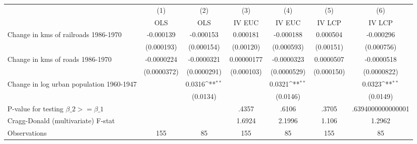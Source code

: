 {
\def\sym#1{\ifmmode^{#1}\else\(^{#1}\)\fi}
\begin{tabular}{l*{6}{c}}
\hline\hline
                &\multicolumn{1}{c}{(1)}&\multicolumn{1}{c}{(2)}&\multicolumn{1}{c}{(3)}&\multicolumn{1}{c}{(4)}&\multicolumn{1}{c}{(5)}&\multicolumn{1}{c}{(6)}\\
                &\multicolumn{1}{c}{OLS}&\multicolumn{1}{c}{OLS}&\multicolumn{1}{c}{IV EUC}&\multicolumn{1}{c}{IV EUC}&\multicolumn{1}{c}{IV LCP}&\multicolumn{1}{c}{IV LCP}\\
\hline
Change in kms of railroads 1986-1970&-0.000139         &-0.000153         & 0.000181         &-0.000188         & 0.000504         &-0.000296         \\
                &(0.000193)         &(0.000154)         &(0.00120)         &(0.000593)         &(0.00151)         &(0.000756)         \\
[1em]
Change in kms of roads 1986-1970&-0.0000224         &-0.0000321         &0.00000177         &-0.0000323         &0.0000507         &-0.0000518         \\
                &(0.0000372)         &(0.0000291)         &(0.000103)         &(0.0000529)         &(0.000150)         &(0.0000822)         \\
[1em]
Change in log urban population 1960-1947&                  &   0.0316\sym{**} &                  &   0.0321\sym{**} &                  &   0.0323\sym{**} \\
                &                  & (0.0134)         &                  & (0.0146)         &                  & (0.0149)         \\
\hline
P-value for testing $\beta\_{2} >= \beta\_{1}$&                  &                  &    .4357         &    .6106         &    .3705         &.6394000000000001         \\
Cragg-Donald (multivariate) F-stat&                  &                  &   1.6924         &   2.1996         &    1.106         &   1.2962         \\
Observations    &      155         &       85         &      155         &       85         &      155         &       85         \\
\hline\hline
\end{tabular}
}
